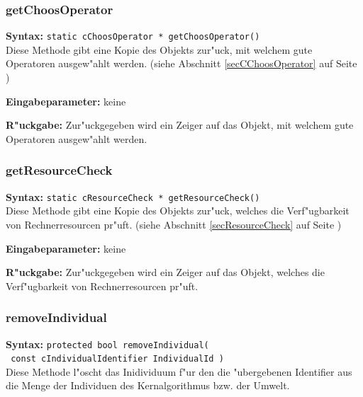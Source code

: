 \subsubsection{getChoosOperator}

\textbf{Syntax:} \verb|static cChoosOperator * getChoosOperator()| \\

Diese Methode gibt eine Kopie des Objekts zur"uck, mit welchem gute Operatoren ausgew"ahlt werden. (siehe Abschnitt \ref{secCChoosOperator} auf Seite \pageref{secCChoosOperator})

\bigskip\noindent
\textbf{Eingabeparameter:} keine

\bigskip\noindent
\textbf{R"uckgabe:} Zur"uckgegeben wird ein Zeiger auf das Objekt, mit welchem gute Operatoren ausgew"ahlt werden.


\subsubsection{getResourceCheck}

\textbf{Syntax:} \verb|static cResourceCheck * getResourceCheck()| \\

Diese Methode gibt eine Kopie des Objekts zur"uck, welches die Verf"ugbarkeit von Rechnerresourcen pr"uft. (siehe Abschnitt \ref{secResourceCheck} auf Seite \pageref{secResourceCheck})

\bigskip\noindent
\textbf{Eingabeparameter:} keine

\bigskip\noindent
\textbf{R"uckgabe:} Zur"uckgegeben wird ein Zeiger auf das Objekt, welches die Verf"ugbarkeit von Rechnerresourcen pr"uft.


\subsubsection{removeIndividual}

\textbf{Syntax:} \verb|protected bool removeIndividual(| \\\verb| const cIndividualIdentifier IndividualId )| \\

Diese Methode l"oscht das Inidividuum f"ur den die "ubergebenen Identifier aus die Menge der Individuen des Kernalgorithmus bzw. der Umwelt.

